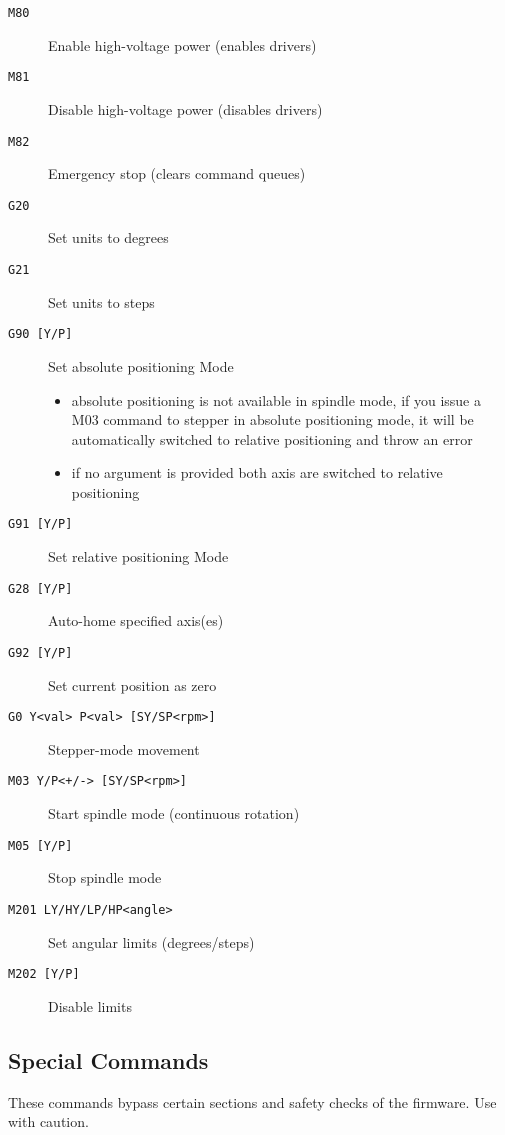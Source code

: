 \begin{description}
  \item[\texttt{M80}] Enable high-voltage power (enables drivers)
  \item[\texttt{M81}] Disable high-voltage power (disables drivers)
  \item[\texttt{M82}] Emergency stop (clears command queues)
  \item[\texttt{G20}] Set units to degrees
  \item[\texttt{G21}] Set units to steps
  \item[\texttt{G90 [Y/P]}] Set absolute positioning Mode
    \begin{itemize}
      \item  absolute positioning is not available in spindle mode, if you issue a M03 command to stepper in absolute positioning mode, it will be automatically switched to relative positioning and throw an error
      \item if no argument is provided both axis are switched to relative positioning
    \end{itemize}
  \item[\texttt{G91 [Y/P]}] Set relative positioning Mode
  \item[\texttt{G28 [Y/P]}] Auto-home specified axis(es)
  \item[\texttt{G92 [Y/P]}] Set current position as zero
  \item[\texttt{G0 Y<val> P<val> [SY/SP<rpm>]}] Stepper-mode movement
  \item[\texttt{M03 Y/P<+/-> [SY/SP<rpm>]}] Start spindle mode (continuous rotation)
  \item[\texttt{M05 [Y/P]}] Stop spindle mode
  \item[\texttt{M201 LY/HY/LP/HP<angle>}] Set angular limits (degrees/steps)
  \item[\texttt{M202 [Y/P]}] Disable limits
\end{description}

\subsection*{Special Commands}

These commands bypass certain sections and safety checks of the firmware. Use with caution.

